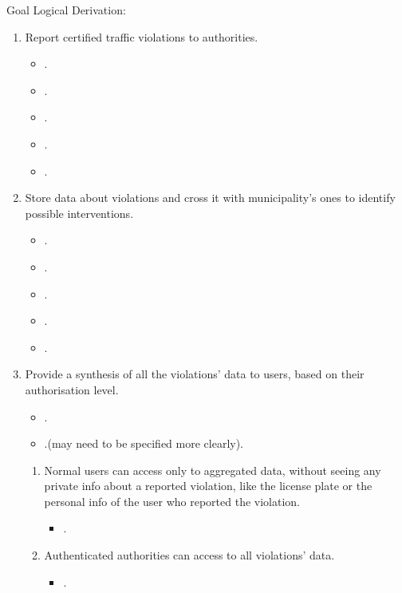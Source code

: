 \bigskip
\bigskip
Goal Logical Derivation:
\begin{enumerate}[label={G\arabic*.}]
	\item Report certified traffic violations to authorities.
	\begin{itemize}[label={}]
		\item {}.
		\item {}.
		\item {}.
		\item {}.
		\item {}.
	\end{itemize}
	\item Store data about violations and cross it with municipality's ones to identify possible interventions.
	\begin{itemize}[label={}]
		\item {}.
	 	\item {}.
	 	\item {}.
	 	\item {}.
	 	\item {}.
	\end{itemize}
	\item Provide a synthesis of all the violations' data to users, based on their authorisation level.
	\begin{itemize}[label={}]
		\item {}.
		\item {}.(may need to be specified more clearly).
	\end{itemize}
	\begin{enumerate}[label={G\arabic{enumi}.\arabic*.}]
		\item Normal users can access only to aggregated data, without seeing any private info about a reported violation, like the license plate or the personal info of the user who reported the violation.
		\begin{itemize}[label={}]
			\item {}.
		\end{itemize}
		\item Authenticated authorities can access to all violations' data.
		\begin{itemize}[label={}]
			\item {}.

\end{itemize}
\end{enumerate}
\end{enumerate}
